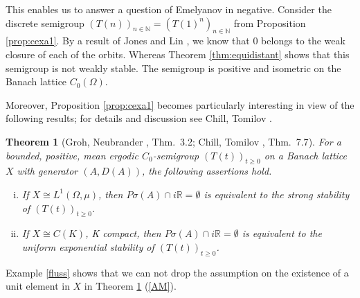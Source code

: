 \documentclass[11pt,intlimits, draft,oneside]{amsart}
\newtheorem{thm}{Theorem}[section]
\theoremstyle{definition}
\def\Psigma{P\sigma}
\def\RR{\mathbb{R}}
\def\NN{\mathbb{N}}
\begin{document}
This 
enables us to answer a question of Emelyanov \cite{emelyanov:2005}
in negative. Consider the discrete semigroup $(T(n))_{n\in\NN}=(T(1)^n)_{n\in\NN}$ 
from Proposition \ref{prop:cexa1}. 
By a result of Jones and Lin \cite{jones/lin:1980}, we know that $0$ belongs 
to the weak closure of each of the orbits. Whereas Theorem \ref{thm:equidistant} 
shows that this semigroup is not weakly stable. The semigroup is positive and 
isometric on the Banach lattice $C_0(\Omega)$. 

 Moreover, Proposition \ref{prop:cexa1} becomes particularly
interesting in view of the following results; for details and
discussion see Chill, Tomilov \cite{chill/tomilov:2004}.


\begin{thm}[{Groh, Neubrander \cite{groh/neubrander:1981}, Thm.~3.2}; {Chill, Tomilov \cite{chill/tomilov:2004}, Thm.~7.7}]
\label{thm:AL,AM} For a bounded, positive, mean ergodic
$C_0$-semigroup $(T(t))_{t\geq 0}$ on a Banach lattice $X$
 with generator $(A,D(A))$, the following assertions hold.
\begin{enumerate}[(i)]
\item
If $X\cong L^1(\Omega, \mu)$, then $\Psigma(A)\cap i\RR = \emptyset$
is equivalent to the \emph{strong stability} of $(T(t))_{t\geq 0}$.
\item \label{AM}
If $X\cong C(K)$, K compact, then $\Psigma(A)\cap i\RR = \emptyset$
is equivalent to the \emph{uniform exponential stability} of
$(T(t))_{t\geq 0}$.
\end{enumerate}
\end{thm}
Example \ref{fluss} shows that we can not drop the assumption on the
existence of a unit element in $X$ in Theorem \ref{thm:AL,AM}
(\ref{AM}).

\hspace{0.5cm}
\end{document}
